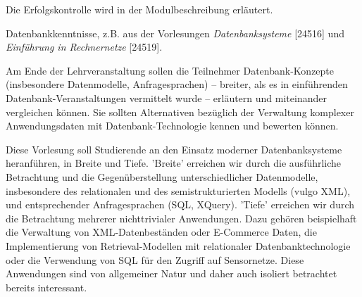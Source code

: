 \begin{course}

\setdoclanguagegerman
{}



\coursehead


\label{cour_5111.dp_997}


\begin{styleenv}
\begin{assessment}
Die Erfolgskontrolle wird in der Modulbeschreibung erläutert.


\end{assessment}

\begin{conditions}Datenbankkenntnisse, z.B. aus der Vorlesungen \emph{Datenbanksysteme }[24516] und \emph{Einführung in Rechnernetze} [24519].

\end{conditions}


\end{styleenv}

\begin{learningoutcomes}
Am Ende der Lehrveranstaltung sollen die Teilnehmer Datenbank-Konzepte (insbesondere Datenmodelle, Anfragesprachen) – breiter, als es in einführenden Datenbank-Veranstaltungen vermittelt wurde – erläutern und miteinander vergleichen können. Sie sollten Alternativen bezüglich der Verwaltung komplexer Anwendungsdaten mit Datenbank-Technologie kennen und bewerten können.


\end{learningoutcomes}

\begin{content}
Diese Vorlesung soll Studierende an den Einsatz moderner Datenbanksysteme heranführen, in Breite und Tiefe. ’Breite’ erreichen wir durch die ausführliche Betrachtung und die Gegenüberstellung unterschiedlicher Datenmodelle, insbesondere des relationalen und des semistrukturierten Modells (vulgo XML), und entsprechender Anfragesprachen (SQL, XQuery). ’Tiefe’ erreichen wir durch die Betrachtung mehrerer nichttrivialer Anwendungen. Dazu gehören beispielhaft die Verwaltung von XML-Datenbeständen oder E-Commerce Daten, die Implementierung von Retrieval-Modellen mit relationaler Datenbanktechnologie oder die Verwendung von SQL für den Zugriff auf Sensornetze. Diese Anwendungen sind von allgemeiner Natur und daher auch isoliert betrachtet bereits interessant.



\end{content}
\end{course}
